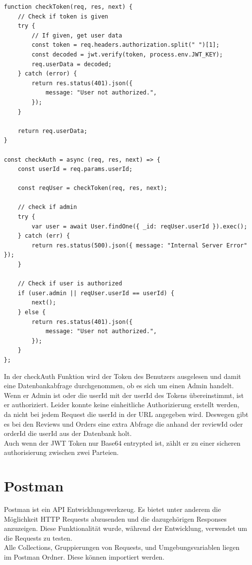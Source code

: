 \begin{lstlisting}[caption={Abfrage des Tokens (backend > api > middleware > check-auth.js)},label={lst:checktoken}]
function checkToken(req, res, next) {
    // Check if token is given
    try {
        // If given, get user data
        const token = req.headers.authorization.split(" ")[1];
        const decoded = jwt.verify(token, process.env.JWT_KEY);
        req.userData = decoded;
    } catch (error) {
        return res.status(401).json({
            message: "User not authorized.",
        });
    }

    return req.userData;
}

const checkAuth = async (req, res, next) => {
    const userId = req.params.userId;

    const reqUser = checkToken(req, res, next);

    // check if admin
    try {
        var user = await User.findOne({ _id: reqUser.userId }).exec();
    } catch (err) {
        return res.status(500).json({ message: "Internal Server Error" });
    }

    // Check if user is authorized
    if (user.admin || reqUser.userId == userId) {
        next();
    } else {
        return res.status(401).json({
            message: "User not authorized.",
        });
    }
};
\end{lstlisting}

In der checkAuth Funktion wird der Token des Benutzers ausgelesen und damit eine Datenbankabfrage durchgenommen, ob es sich um einen Admin handelt. Wenn er Admin ist oder die userId mit der userId des Tokens übereinstimmt, ist er authoriziert. Leider konnte keine einheitliche Authorizierung erstellt werden, da nicht bei jedem Request die userId in der URL angegeben wird. Deswegen gibt es bei den Reviews und Orders eine extra Abfrage die anhand der reviewId oder orderId die userId aus der Datenbank holt.\\
Auch wenn der JWT Token nur Base64 entrypted ist, zählt er zu einer sicheren authorisierung zwischen zwei Parteien.

\section{Postman}
Postman ist ein API Entwicklungswerkzeug. Es bietet unter anderem die Möglichkeit HTTP Requests abzusenden und die dazugehörigen Responses anzuzeigen. Diese Funktionalität wurde, während der Entwicklung, verwendet um die Requests zu testen.\\
Alle Collections, Gruppierungen von Requests, und Umgebungsvariablen liegen im Postman Ordner. Diese können importiert werden.

